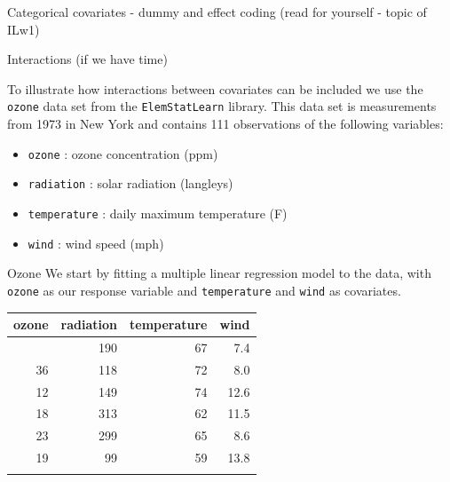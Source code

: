 \documentclass[
  ignorenonframetext,
]{beamer}
\newcounter{none} %
\providecommand{\tightlist}{%
  \setlength{\itemsep}{0pt}\setlength{\parskip}{0pt}}
\begin{document}
\begin{frame}{Categorical covariates - dummy and effect coding}
\protect{}\label{categorical-covariates---dummy-and-effect-coding}
(read for yourself - topic of ILw1)
\end{frame}

\begin{frame}[fragile]{Interactions}
\protect{}\label{interactions}
(if we have time)

To illustrate how interactions between covariates can be included we use
the \texttt{ozone} data set from the \texttt{ElemStatLearn} library.
This data set is measurements from 1973 in New York and contains 111
observations of the following variables:

\begin{itemize}
\tightlist
\item
  \texttt{ozone} : ozone concentration (ppm)
\item
  \texttt{radiation} : solar radiation (langleys)
\item
  \texttt{temperature} : daily maximum temperature (F)
\item
  \texttt{wind} : wind speed (mph)
\end{itemize}
\end{frame}

\begin{frame}[fragile]{Ozone}
\protect{}\label{ozone}
We start by fitting a multiple linear regression model to the data, with
\texttt{ozone} as our response variable and \texttt{temperature} and
\texttt{wind} as covariates.

{\def\LTcaptype{none} %
\begin{longtable}[]{@{}rrrr@{}}
\toprule\noalign{}
ozone & radiation & temperature & wind \\
\midrule\noalign{}
\endhead
41 & 190 & 67 & 7.4 \\
36 & 118 & 72 & 8.0 \\
12 & 149 & 74 & 12.6 \\
18 & 313 & 62 & 11.5 \\
23 & 299 & 65 & 8.6 \\
19 & 99 & 59 & 13.8 \\
\bottomrule\noalign{}
\end{longtable}
}
\end{frame}
\end{document}
